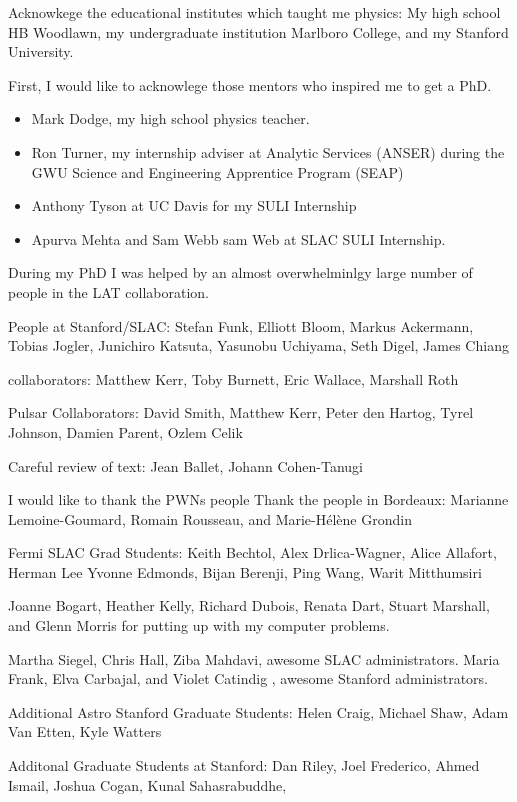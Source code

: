 

Acknowkege the educational institutes which taught me physics: My high school HB Woodlawn,
my undergraduate institution Marlboro College, and my Stanford University.

First, I would like to acknowlege those mentors who inspired me to get a PhD.
\begin{itemize}
  \item Mark Dodge, my high school physics teacher.
  \item Ron Turner, my internship adviser at Analytic Services (ANSER) during the 
  GWU Science and Engineering Apprentice Program (SEAP)
  \item Anthony Tyson at UC Davis for my SULI Internship
  \item Apurva Mehta and Sam Webb sam Web at SLAC SULI Internship.
\end{itemize}


During my PhD I was helped by an almost overwhelminlgy large 
number of people in the \ac{LAT} collaboration.

People at Stanford/SLAC: Stefan Funk, Elliott Bloom, 
Markus Ackermann, Tobias Jogler, Junichiro Katsuta, Yasunobu Uchiyama, Seth Digel, 
James Chiang

\pointlike collaborators: Matthew Kerr, Toby Burnett, Eric Wallace, Marshall Roth

Pulsar Collaborators: David Smith, Matthew Kerr, Peter den Hartog, Tyrel Johnson, Damien Parent, Ozlem Celik

Careful review of text: Jean Ballet, Johann Cohen-Tanugi

I would like to thank the \acp{PWN} people
Thank the people in Bordeaux: Marianne Lemoine-Goumard, Romain Rousseau, and Marie-H\'el\`ene Grondin


Fermi SLAC Grad Students: Keith Bechtol, Alex Drlica-Wagner, Alice Allafort, Herman Lee
Yvonne Edmonds, Bijan Berenji, Ping Wang, Warit Mitthumsiri


Joanne Bogart, Heather Kelly, Richard Dubois, Renata Dart, Stuart Marshall, and Glenn Morris for putting up with my computer problems.

Martha Siegel, Chris Hall, Ziba Mahdavi, awesome SLAC administrators.
Maria Frank, Elva Carbajal, and Violet Catindig , awesome Stanford administrators.

Additional Astro Stanford Graduate Students: Helen Craig, Michael Shaw, Adam Van Etten, Kyle Watters

Additonal Graduate Students at Stanford: Dan Riley, Joel Frederico, Ahmed Ismail, Joshua Cogan, Kunal Sahasrabuddhe,
